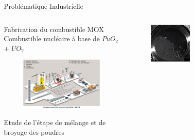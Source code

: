 \documentclass[aspectratio=169]{beamer} %
\begin{document}
\begin{frame}{Problématique Industrielle}
    \vspace{-0.25cm}
    \begin{columns}[t]
        \begin{column}{0.5\textwidth}
            \small
            \begin{block}{Fabrication du combustible MOX}
                Combustible nucléaire à base de $PuO_2$ + $UO_2$
                \begin{figure}
                    \includegraphics[width=\textwidth]{../CSI_2024/image/cycle_combustible.png}
                \end{figure}
                Etude de l'étape de mélange et de broyage des poudres
            \end{block}
        \end{column}
        \begin{column}{0.5\textwidth}
            \small
            \begin{figure}
                \centering
                \includegraphics[width=0.5\textwidth]{../CSI_2024/image/broyage.png}

\end{figure}
\end{column}
\end{columns}
\end{frame}
\end{document}
